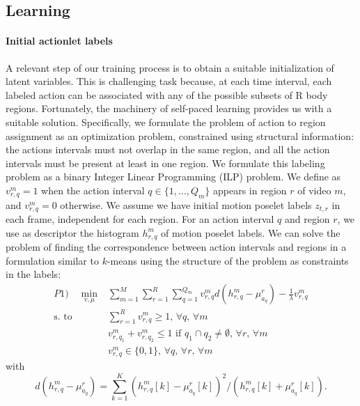 \subsection{Learning} \label{subsec:learning}

\paragraph{Initial actionlet labels }A relevant step of our training process is to obtain a suitable initialization 
of latent variables. This is challenging task because, at each time 
interval, each labeled action can be associated with any of the possible 
subsets of R body regions. Fortunately, the machinery of self-paced 
learning \cite{Kumar:EtAl:2010} provides us with a suitable solution. Specifically, we 
formulate the problem of action to region 
assignment as an optimization problem, constrained using structural 
information: 
the actions intervals must not overlap in the same region, and all the action 
intervals must be present at least in one region. We formulate this labeling 
problem as a binary Integer Linear Programming (ILP) problem. We define as 
$v_{r,q}^m=1$ when the action interval $q \in \{1,\dots,Q_m\}$ appears in 
region 
$r$ of video $m$, and $v_{r,q}^m=0$ otherwise. We assume we have initial motion poselet 
labels 
$z_{t,r}$ in each frame, independent for each region. For an action interval $q$ and region $r$, we use as 
descriptor the histogram $h_{r,q}^m$ of motion poselet labels. We can solve the problem of finding 
the correspondence between action intervals and regions in a formulation 
similar 
to $k$-means using the structure of the problem as constraints in the labels:
\begin{equation}
\begin{split}
P1) \quad \min_{v,\mu} &\sum_{m=1}^M  \sum_{r=1}^R \sum_{q=1}^{Q_m}  v_{r,q}^m 
d( h_{r,q}^m - \mu_{a_q}^r) -\frac{1}{\lambda} v_{r,q}^m\\ 
 \text{s. to} 
\quad 
& \sum_{r=1}^R v_{r,q}^m \ge 1\text{, }\forall q\text{, }\forall m \\ 
& v_{r,q_1}^m + v_{r,q_2}^m \le 1 \text{ if } q_1\cap q_2 \neq \emptyset 
\text{, 
}\forall r\text{, }\forall m\\  
& v_{r,q}^m \in \{0,1\}\text{, }\forall q\text{, }\forall{r}\text{, }\forall m
\end{split}
\end{equation}
with
\begin{equation}
d( h_{r,q}^m - \mu_{a_q}^r) = \sum_{k=1}^K (h_{r,q}^m[k] - 
\mu_{a_q}^r[k])^2/(h_{r,q}^m[k] +\mu_{a_q}^r[k]).
\end{equation}


